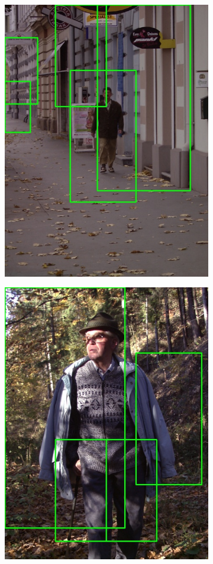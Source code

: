 \documentclass[galician]{./head/uvigo-tfg}
\begin{document}
\begin{figure}[h]
\begin{subfigure}{.3\textwidth}
          \label{fig:person5}
        \end{subfigure}
        \begin{subfigure}{.3\textwidth}
          \centering
          \includegraphics[width=0.8\linewidth]{figures/person6.jpg}
          \label{fig:person6}
        \end{subfigure}
        \begin{subfigure}{.3\textwidth}
          \centering
          \includegraphics[width=0.8\linewidth]{figures/person8.jpg}

\end{subfigure}
\end{figure}
\end{document}
